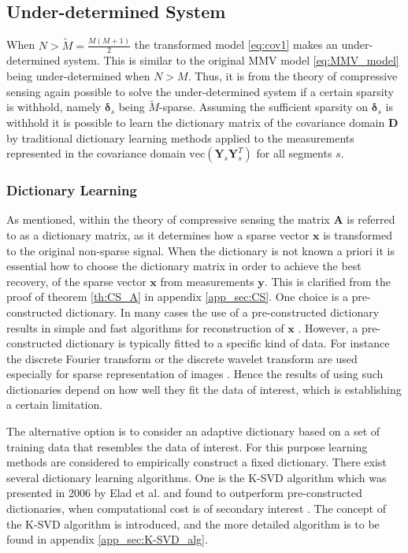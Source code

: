 \subsection{Under-determined System}\label{sec:cov1}
When $N > \widetilde{M} = \frac{M(M+1)}{2}$ the transformed model \eqref{eq:cov1} makes an under-determined system.   
This is similar to the original MMV model \eqref{eq:MMV_model} being under-determined  when $N > M$. 
Thus, it is from the theory of compressive sensing again possible to solve the under-determined system if a certain sparsity is withhold, namely $\boldsymbol{\delta}_s$ being $\widetilde{M}$-sparse.
Assuming the sufficient sparsity on $\boldsymbol{\delta}_s$ is withhold it is possible to learn the dictionary matrix of the covariance domain $\mathbf{D}$ by traditional dictionary learning methods applied to the measurements represented in the covariance domain $\text{vec}\left( \mathbf{Y}_s \mathbf{Y}_s^T \right)$ for all segments $s$.

\subsubsection{Dictionary Learning}\label{sec:dictionarylearning}
As mentioned, within the theory of compressive sensing the matrix $\textbf{A}$ is referred to as a dictionary matrix, as it determines how a sparse vector $\textbf{x}$ is transformed to the original non-sparse signal. 
When the dictionary is not known a priori it is essential how to choose the dictionary matrix in order to achieve the best recovery, of the sparse vector $\mathbf{x}$ from measurements $\mathbf{y}$. 
This is clarified from the proof of theorem \ref{th:CS_A} in appendix \ref{app_sec:CS}. 
One choice is a pre-constructed dictionary. 
In many cases the use of a pre-constructed dictionary results in simple and fast algorithms for reconstruction of $\mathbf{x}$ \cite{Elad_book}. 
However, a pre-constructed dictionary is typically fitted to a specific kind of data. 
For instance the discrete Fourier transform or the discrete wavelet transform are used especially for sparse representation of images \cite{Elad_book}. 
Hence the results of using such dictionaries depend on how well they fit the data of interest, which is establishing a certain limitation. 

The alternative option is to consider an adaptive dictionary based on a set of training data that resembles the data of interest. 
For this purpose learning methods are considered to empirically construct a fixed dictionary. 
There exist several dictionary learning algorithms. One is the K-SVD algorithm which was presented in 2006 by Elad et al. and found to outperform pre-constructed dictionaries, when computational cost is of secondary interest \cite{Elad2006}. 
The concept of the K-SVD algorithm is introduced, and the more detailed algorithm is to be found in appendix \ref{app_sec:K-SVD_alg}. 

